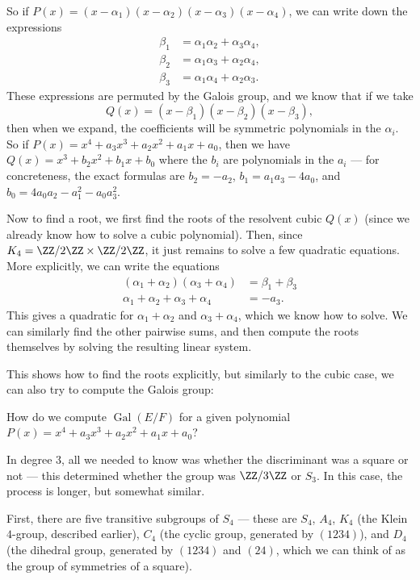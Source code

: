 So if $P(x) = (x - \alpha_1)(x - \alpha_2)(x - \alpha_3)(x - \alpha_4)$, we can write down the expressions 
\begin{align*}
    \beta_1 &= \alpha_1\alpha_2 + \alpha_3\alpha_4, \\
    \beta_2 &= \alpha_1\alpha_3 + \alpha_2\alpha_4, \\
    \beta_3 &= \alpha_1\alpha_4 + \alpha_2\alpha_3.
\end{align*}
These expressions are permuted by the Galois group, and we know that if we take \[Q(x) = (x - \beta_1)(x - \beta_2)(x - \beta_3),\] then when we expand, the coefficients will be symmetric polynomials in the $\alpha_i$. So if $P(x) = x^4 + a_3x^3 + a_2x^2 + a_1x + a_0$, then we have $Q(x) = x^3 + b_2x^2 + b_1x + b_0$ where the $b_i$ are polynomials in the $a_i$ --- for concreteness, the exact formulas are $b_2 = -a_2$, $b_1 = a_1a_3 - 4a_0$, and $b_0 = 4a_0a_2 - a_1^2 - a_0a_3^2$. 

Now to find a root, we first find the roots of the resolvent cubic $Q(x)$ (since we already know how to solve a cubic polynomial). Then, since $K_4 = \ZZ/2\ZZ \times \ZZ/2\ZZ$, it just remains to solve a few quadratic equations. More explicitly, we can write the equations 
\begin{align*}
    (\alpha_1 + \alpha_2)(\alpha_3 + \alpha_4) &= \beta_1 + \beta_3 \\
    \alpha_1 + \alpha_2 + \alpha_3 + \alpha_4 &= -a_3.
\end{align*}
This gives a quadratic for $\alpha_1 + \alpha_2$ and $\alpha_3 + \alpha_4$, which we know how to solve. We can similarly find the other pairwise sums, and then compute the roots themselves by solving the resulting linear system. 

This shows how to find the roots explicitly, but similarly to the cubic case, we can also try to compute the Galois group:

\begin{qq}
    How do we compute $\operatorname{Gal}(E/F)$ for a given polynomial $P(x) = x^4 + a_3x^3 + a_2x^2 + a_1x + a_0$?
\end{qq}

In degree $3$, all we needed to know was whether the discriminant was a square or not --- this determined whether the group was $\ZZ/3\ZZ$ or $S_3$. In this case, the process is longer, but somewhat similar. 

First, there are five transitive subgroups of $S_4$ --- these are $S_4$, $A_4$, $K_4$ (the Klein $4$-group, described earlier), $C_4$ (the cyclic group, generated by $(1234)$), and $D_4$ (the dihedral group, generated by $(1234)$ and $(24)$, which we can think of as the group of symmetries of a square).


